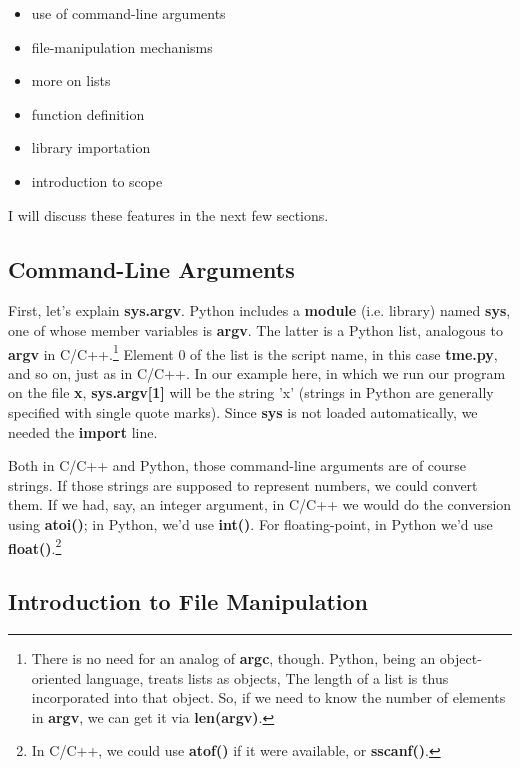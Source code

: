 \begin{itemize}

\item use of command-line arguments

\item file-manipulation mechanisms

\item more on lists

\item function definition

\item library importation 

\item introduction to scope 

\end{itemize}

I will discuss these features in the next few sections.

\subsection{Command-Line Arguments}

First, let's explain {\bf sys.argv}.  Python includes a {\bf module}
(i.e. library) named {\bf sys}, one of whose member variables is {\bf
argv}.  The latter is a Python list, analogous to {\bf argv} in
C/C++.\footnote{There is no need for an analog of {\bf argc}, though.
Python, being an object-oriented language, treats lists as objects, The
length of a list is thus incorporated into that object.  So, if we need
to know the number of elements in {\bf argv}, we can get it via {\bf
len(argv)}.} Element 0 of the list is the script name, in this case {\bf
tme.py}, and so on, just as in C/C++.  In our example here, in which we
run our program on the file {\bf x}, {\bf sys.argv[1]} will be the
string 'x' (strings in Python are generally specified with single quote
marks).  Since {\bf sys} is not loaded automatically, we needed the {\bf
import} line.

Both in C/C++ and Python, those command-line arguments are of course
strings.  If those strings are supposed to represent numbers, we could
convert them.  If we had, say, an integer argument, in C/C++ we would do
the conversion using {\bf atoi()}; in Python, we'd use {\bf int()}.  For
floating-point, in Python we'd use {\bf float()}.\footnote{In C/C++, we
could use {\bf atof()} if it were available, or {\bf sscanf()}.}

\subsection{Introduction to File Manipulation}
\label{files}

